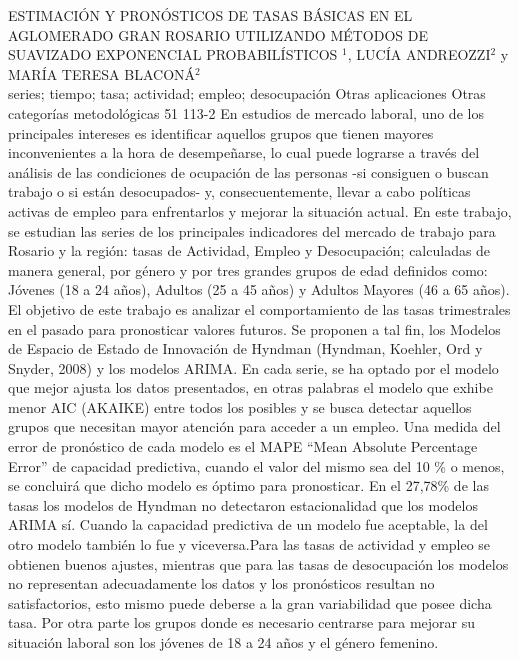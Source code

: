 \A
{ESTIMACIÓN Y PRONÓSTICOS DE TASAS BÁSICAS EN EL AGLOMERADO GRAN ROSARIO UTILIZANDO MÉTODOS DE SUAVIZADO EXPONENCIAL PROBABILÍSTICOS}
{$^1$, LUCÍA ANDREOZZI$^2$ y MARÍA TERESA BLACONÁ$^2$}
{
\\}
{series; tiempo; tasa; actividad; empleo; desocupación} 
 {Otras aplicaciones} 
 {Otras categorías metodológicas} 
 {51} 
 {113-2}
{En estudios de mercado laboral, uno de los principales intereses es identificar aquellos grupos que tienen mayores inconvenientes a la hora de desempeñarse, lo cual puede lograrse a través del análisis de las condiciones de ocupación de las personas -si consiguen o buscan trabajo o si están desocupados- y, consecuentemente, llevar a cabo políticas activas de empleo para enfrentarlos y mejorar la situación actual. En este trabajo, se estudian las series de los principales indicadores del mercado de trabajo para Rosario y la región: tasas de Actividad, Empleo y Desocupación; calculadas de manera general, por género y por tres grandes grupos de edad definidos como: Jóvenes (18 a 24 años), Adultos (25 a 45 años) y Adultos Mayores (46 a 65 años). El objetivo de este trabajo es analizar el comportamiento de las tasas trimestrales en el pasado para pronosticar valores futuros. Se proponen a tal fin, los Modelos de Espacio de Estado de Innovación de Hyndman (Hyndman, Koehler, Ord y Snyder, 2008) y los modelos ARIMA. En cada serie, se ha optado por el modelo que mejor ajusta los datos presentados, en otras palabras el modelo que exhibe menor AIC (AKAIKE) entre todos los posibles y se busca detectar aquellos grupos que necesitan mayor atención para acceder a un empleo. Una medida del error de pronóstico de cada modelo es el MAPE “Mean Absolute Percentage Error” de capacidad predictiva, cuando el valor del mismo sea del 10 \% o menos, se concluirá que dicho modelo es óptimo para pronosticar. En el 27,78\% de las tasas los modelos de Hyndman no detectaron estacionalidad que los modelos ARIMA sí. Cuando la capacidad predictiva de un modelo fue aceptable, la del otro modelo también lo fue y viceversa.Para las tasas de actividad y empleo se obtienen buenos ajustes, mientras que para las tasas de desocupación los modelos no representan adecuadamente los datos y los pronósticos resultan no satisfactorios, esto mismo puede deberse a la gran variabilidad que posee dicha tasa. Por otra parte los grupos donde es necesario centrarse para mejorar su situación laboral son los jóvenes de 18 a 24 años y el género femenino. }
